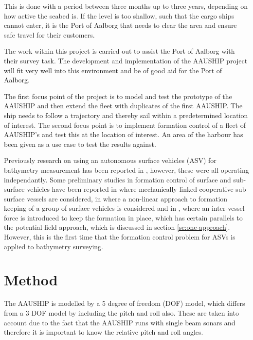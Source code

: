 \documentclass[a4paper,conference]{IEEEtran}
\begin{document}
This is done with a period between three months up to three years,
depending on how active the seabed is. If the level is too shallow,
such that the cargo ships cannot enter, it is the Port of Aalborg that
needs to clear the area and ensure safe travel for their customers.

The work within this project is carried out to assist the Port of
Aalborg with their survey task. The development and implementation of
the AAUSHIP project will fit very well into this environment and be of
good aid for the Port of Aalborg.

The first focus point of the project is to model and test the
prototype of the AAUSHIP and then extend the fleet with duplicates of
the first AAUSHIP. The ship needs to follow a trajectory and thereby
sail within a predetermined location of interest. The second focus
point is to implement formation control of a fleet of AAUSHIP's and
test this at the location of interest. An area of the harbour has been
given as a use case to test the results against.

Previously research on using an autonomous surface vehicles (ASV) for bathymetry measurement has been reported in \cite{7271495, 5278235, 809261}, however, these were all operating independantly. Some preliminary studies in formation control of surface and sub-surface vehicles have been reported in \cite{7271700} where mechanically linked cooperative sub-surface vessels are considered, in \cite{4302258} where a non-linear approach to formation keeping of a group of surface vehicles is considered and in \cite{123}, where an inter-vessel force is introduced to keep the formation in place, which has certain parallels to the potential field approach, which is discussed in section \ref{sc:one-approach}. However, this is the first time that the formation control problem for ASVs is applied to bathymetry surveying.

\section{Method}
The AAUSHIP is modelled by a 5 degree of freedom (DOF) model, which differs
from a 3 DOF model by including the pitch and roll also.
These are taken into account due to the fact that the AAUSHIP runs
with single beam sonars and therefore it is important to know the
relative pitch and roll angles. 
\end{document}
